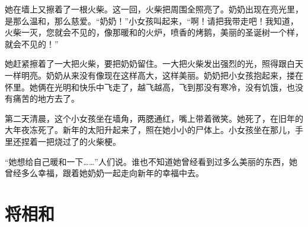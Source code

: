 \documentclass[12pt,UTF-8,openany]{ctexbook}
\begin{document}
\begin{Large}
    她在墙上又擦着了一根火柴。这一回，火柴把周围全照亮了。奶奶出现在亮光里，是那么温和，那么慈爱。“奶奶！”小女孩叫起来，“啊！请把我带走吧！我知道，火柴一灭，您就会不见的，像那暖和的火炉，喷香的烤鹅，美丽的圣诞树一个样，就会不见的！”
    
    她赶紧擦着了一大把火柴，要把奶奶留住。一大把火柴发出强烈的光，照得跟白天一样明亮。奶奶从来没有像现在这样高大，这样美丽。奶奶把小女孩抱起来，搂在怀里。她俩在光明和快乐中飞走了，越飞越高，飞到那没有寒冷，没有饥饿，也没有痛苦的地方去了。
    
    第二天清晨，这个小女孩坐在墙角，两腮通红，嘴上带着微笑。她死了，在旧年的大年夜冻死了。新年的太阳升起来了，照在她小小的尸体上。小女孩坐在那儿，手里还捏着一把烧过了的火柴梗。
    
    “她想给自己暖和一下……”人们说。谁也不知道她曾经看到过多么美丽的东西，她曾经多么幸福，跟着她奶奶一起走向新年的幸福中去。
    
\end{Large}

\chapter{将相和}
\end{document}
